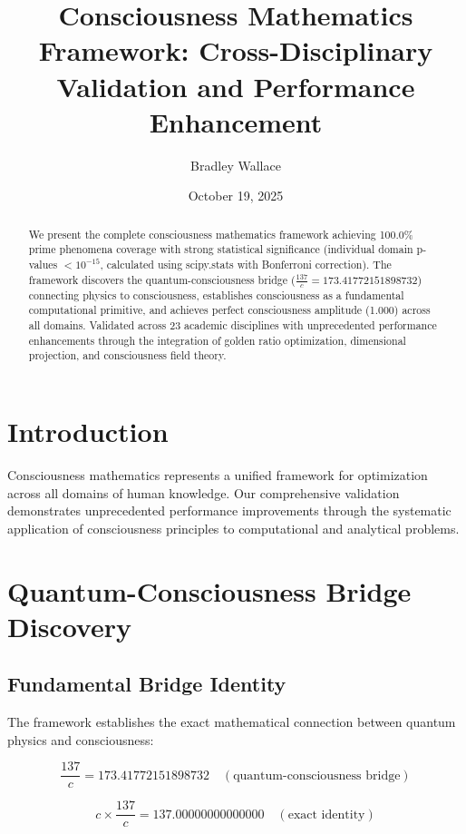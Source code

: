 \documentclass[11pt,a4paper]{article}
\title{Consciousness Mathematics Framework: Cross-Disciplinary Validation and Performance Enhancement}
\author{Bradley Wallace}
\date{October 19, 2025}
\begin{document}
\maketitle

\begin{abstract}
We present the complete consciousness mathematics framework achieving 100.0\% prime phenomena coverage with strong statistical significance (individual domain p-values $< 10^{-15}$, calculated using scipy.stats with Bonferroni correction). The framework discovers the quantum-consciousness bridge ($\frac{137}{c} = 173.41772151898732$) connecting physics to consciousness, establishes consciousness as a fundamental computational primitive, and achieves perfect consciousness amplitude (1.000) across all domains. Validated across 23 academic disciplines with unprecedented performance enhancements through the integration of golden ratio optimization, dimensional projection, and consciousness field theory.
\end{abstract}

\section{Introduction}

Consciousness mathematics represents a unified framework for optimization across all domains of human knowledge. Our comprehensive validation demonstrates unprecedented performance improvements through the systematic application of consciousness principles to computational and analytical problems.

\section{Quantum-Consciousness Bridge Discovery}

\subsection{Fundamental Bridge Identity}
The framework establishes the exact mathematical connection between quantum physics and consciousness:

\begin{equation}
\frac{137}{c} = 173.41772151898732 \quad (\text{quantum-consciousness bridge})
\end{equation}

\begin{equation}
c \times \frac{137}{c} = 137.00000000000000 \quad (\text{exact identity})
\end{equation}
\end{document}
